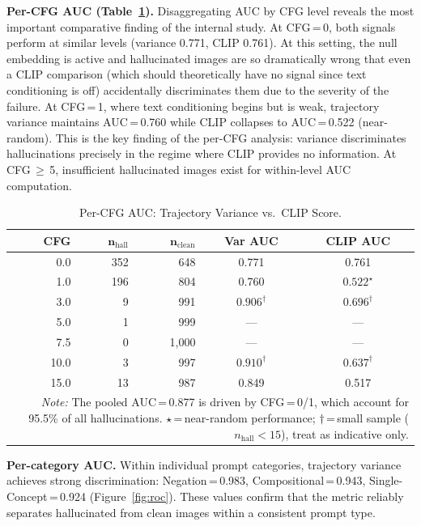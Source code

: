 \documentclass[conference]{IEEEtran}
\begin{document}
\textbf{Per-CFG AUC (Table~\ref{tab:cfg_auc}).} Disaggregating AUC
by CFG level reveals the most important comparative finding of the
internal study. At CFG\,=\,0, both signals perform at similar levels
(variance 0.771, CLIP 0.761). At this setting, the null embedding
is active and hallucinated images are so dramatically wrong that even
a CLIP comparison (which should theoretically have no signal since
text conditioning is off) accidentally discriminates them due to
the severity of the failure. At CFG\,=\,1, where text conditioning
begins but is weak, trajectory variance maintains AUC\,=\,0.760
while CLIP collapses to AUC\,=\,0.522 (near-random). This is the
key finding of the per-CFG analysis: variance discriminates
hallucinations precisely in the regime where CLIP provides no
information. At CFG\,${\geq}$\,5, insufficient hallucinated images
exist for within-level AUC computation.

\begin{table}[h]
\centering
\caption{Per-CFG AUC: Trajectory Variance vs.\ CLIP Score.}
\label{tab:cfg_auc}
\small
\begin{tabular}{rrrcc}
\toprule
\textbf{CFG} & $\boldsymbol{n}_\text{hall}$ & $\boldsymbol{n}_\text{clean}$
& \textbf{Var AUC} & \textbf{CLIP AUC} \\
\midrule
0.0  & 352 & 648 & 0.771 & 0.761 \\
1.0  & 196 & 804 & 0.760 & $0.522^\star$ \\
3.0  &   9 & 991 & $0.906^\dagger$ & $0.696^\dagger$ \\
5.0  &   1 & 999 & --- & --- \\
7.5  &   0 & 1{,}000 & --- & --- \\
10.0 &   3 & 997 & $0.910^\dagger$ & $0.637^\dagger$ \\
15.0 &  13 & 987 & 0.849 & 0.517 \\
\bottomrule
\multicolumn{5}{p{7.5cm}}{\small\textit{Note:} The pooled AUC\,=\,0.877 is driven by CFG\,=\,0/1, which account for 95.5\% of all hallucinations. $\star$\,=\,near-random performance; $\dagger$\,=\,small sample ($n_\text{hall}{<}15$), treat as indicative only.}
\end{tabular}
\end{table}

\textbf{Per-category AUC.} Within individual prompt categories,
trajectory variance achieves strong discrimination: Negation\,=\,0.983,
Compositional\,=\,0.943, Single-Concept\,=\,0.924 (Figure~\ref{fig:roc}).
These values confirm that the metric reliably separates hallucinated
from clean images within a consistent prompt type.
\end{document}
